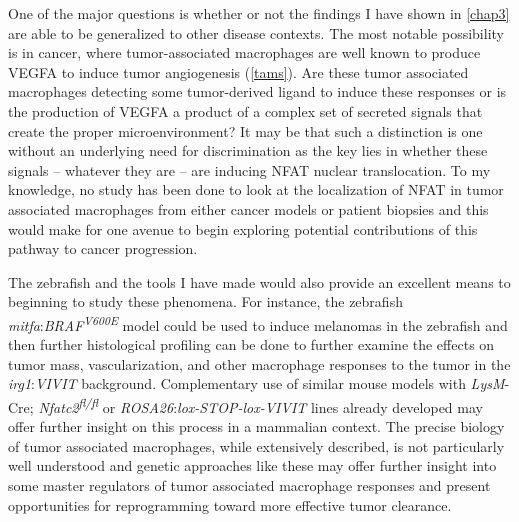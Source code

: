 One of the major questions is whether or not the findings I have shown in \autoref{chap3} are able to be generalized to other disease contexts. The most notable possibility is in cancer, where tumor\hyp{}associated macrophages are well known to produce VEGFA to induce tumor angiogenesis (\autoref{tams}). Are these tumor associated macrophages detecting some tumor\hyp{}derived ligand to induce these responses or is the production of VEGFA a product of a complex set of secreted signals that create the proper microenvironment? It may be that such a distinction is one without an underlying need for discrimination as the key lies in whether these signals -- whatever they are -- are inducing NFAT nuclear translocation. To my knowledge, no study has been done to look at the localization of NFAT in tumor associated macrophages from either cancer models or patient biopsies and this would make for one avenue to begin exploring potential contributions of this pathway to cancer progression. 

The zebrafish and the tools I have made would also provide an excellent means to beginning to study these phenomena. For instance, the zebrafish \textit{mitfa}:\textit{BRAF\textsuperscript{V600E}} model could be used to induce melanomas in the zebrafish and then further histological profiling can be done to further examine the effects on tumor mass, vascularization, and other macrophage responses to the tumor in the \textit{irg1}:\textit{VIVIT} background. Complementary use of similar mouse models with \textit{LysM}\hyp{}Cre; \textit{Nfatc2\textsuperscript{fl/fl}} or \textit{ROSA26}:\textit{lox\hyp{}STOP\hyp{}lox\hyp{}VIVIT} lines already developed may offer further insight on this process in a mammalian context. The precise biology of tumor associated macrophages, while extensively described, is not particularly well understood and genetic approaches like these may offer further insight into some master regulators of tumor associated macrophage responses and present opportunities for reprogramming toward more effective tumor clearance. 

